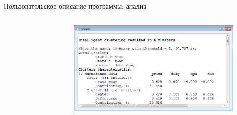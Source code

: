\documentclass[aspectratio=169,tikz]{beamer}
\begin{document}
	\begin{frame}{Пользовательское описание программы: анализ}
	\begin{columns}
		\begin{figure}[T] %
			\centering
			
		\end{figure}
		\begin{figure}[T] %
			\centering
			\includegraphics[width=0.95\linewidth]{img/diploma/instruction/text-report}
		\end{figure}
	\end{columns}
	\end{frame}	
\end{document}
